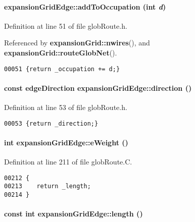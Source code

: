 \paragraph{\setlength{\rightskip}{0pt plus 5cm}expansion\-Grid\-Edge::add\-To\-Occupation (int {\em d})\hspace{0.3cm}{\tt  [inline]}}\hfill



Definition at line 51 of file glob\-Route.h.

Referenced by {\bf expansion\-Grid::nwires}(), and {\bf expansion\-Grid::route\-Glob\-Net}().\small\begin{verbatim}00051 {return _occupation += d;}
\end{verbatim}\normalsize 
\label{expansionGridEdge_a3}
\paragraph{\setlength{\rightskip}{0pt plus 5cm}const {\bf edge\-Direction} expansion\-Grid\-Edge::direction ()\hspace{0.3cm}{\tt  [inline]}}\hfill



Definition at line 53 of file glob\-Route.h.\small\begin{verbatim}00053 {return _direction;}
\end{verbatim}\normalsize 
\label{expansionGridEdge_a7}
\paragraph{\setlength{\rightskip}{0pt plus 5cm}int expansion\-Grid\-Edge::e\-Weight ()\hspace{0.3cm}{\tt  [virtual]}}\hfill



Definition at line 211 of file glob\-Route.C.\small\begin{verbatim}00212 {
00213    return _length;
00214 }
\end{verbatim}\normalsize 
\label{expansionGridEdge_a6}
\paragraph{\setlength{\rightskip}{0pt plus 5cm}const int expansion\-Grid\-Edge::length ()\hspace{0.3cm}{\tt  [inline]}}\hfill



